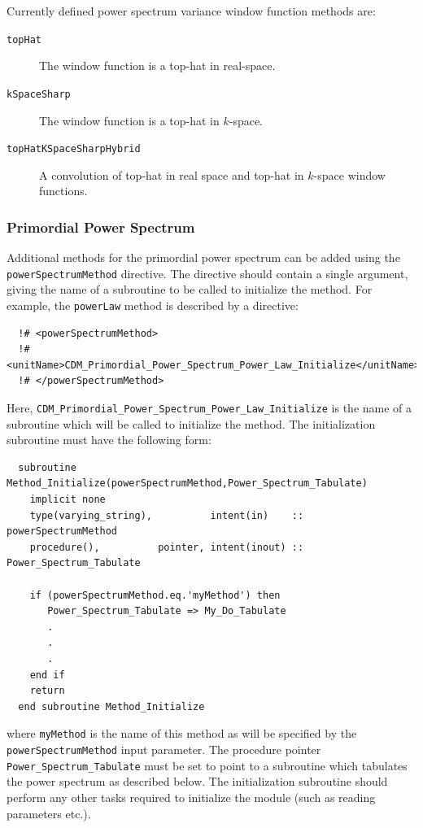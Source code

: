 Currently defined power spectrum variance window function methods are:
\begin{description}
 \item [{\tt topHat}] The window function is a top-hat in real-space.
 \item [{\tt kSpaceSharp}] The window function is a top-hat in $k$-space.
 \item [{\tt topHatKSpaceSharpHybrid}] A convolution of top-hat in real space and top-hat in $k$-space window functions.
\end{description}

\subsubsection{Primordial Power Spectrum}

Additional methods for the primordial power spectrum can be added using the {\tt powerSpectrumMethod} directive. The directive should contain a single argument, giving the name of a subroutine to be called to initialize the method. For example, the {\tt powerLaw} method is described by a directive:
\begin{verbatim}
  !# <powerSpectrumMethod>
  !#  <unitName>CDM_Primordial_Power_Spectrum_Power_Law_Initialize</unitName>
  !# </powerSpectrumMethod>
\end{verbatim}
Here, {\tt CDM\_Primordial\_Power\_Spectrum\_Power\_Law\_Initialize} is the name of a subroutine which will be called to initialize the method. The initialization subroutine must have the following form:
\begin{verbatim}
  subroutine Method_Initialize(powerSpectrumMethod,Power_Spectrum_Tabulate)
    implicit none
    type(varying_string),          intent(in)    :: powerSpectrumMethod
    procedure(),          pointer, intent(inout) :: Power_Spectrum_Tabulate
    
    if (powerSpectrumMethod.eq.'myMethod') then
       Power_Spectrum_Tabulate => My_Do_Tabulate
       .
       .
       .
    end if
    return
  end subroutine Method_Initialize
\end{verbatim}
where {\tt myMethod} is the name of this method as will be specified by the {\tt powerSpectrumMethod} input parameter. The procedure pointer {\tt Power\_Spectrum\_Tabulate} must be set to point to a subroutine which tabulates the power spectrum as described below. The initialization subroutine should perform any other tasks required to initialize the module (such as reading parameters etc.).

